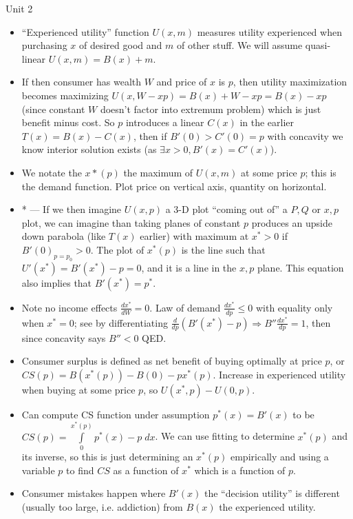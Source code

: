 \documentclass[10pt,twocolumn]{article}
\newcommand{\rd}[2]{\frac{d#1}{d#2}}
\begin{document}
Unit 2
\begin{itemize}
    \item ``Experienced utility'' function $U(x, m)$ measures utility experienced when purchasing $x$ of desired good and $m$ of other stuff. We will assume quasi-linear $U(x,m) = B(x) + m$.
    \item If then consumer has wealth $W$ and price of $x$ is $p$, then utility maximization becomes maximizing $U(x, W - xp) = B(x) + W - xp = B(x) - xp$ (since constant $W$ doesn't factor into extremum problem) which is just benefit minus cost. So $p$ introduces a linear $C(x)$ in the earlier $T(x) = B(x) - C(x)$, then if $B'(0) > C'(0) = p$ with concavity we know interior solution exists (as $\exists x > 0, B'(x) = C'(x)$). 
    \item We notate the $x*(p)$ the maximum of $U(x,m)$ at some price $p$; this is the demand function. Plot price on vertical axis, quantity on horizontal. 
    \item * --- If we then imagine $U(x,p)$ a 3-D plot ``coming out of'' a $P,Q$ or $x,p$ plot, we can imagine than taking planes of constant $p$ produces an upside down parabola (like $T(x)$ earlier) with maximum at $x^* > 0$ if $B'(0)_{p=p_0} > 0$. The plot of $x^*(p)$ is the line such that $U'(x^*) = B'(x^*) - p = 0$, and it is a line in the $x,p$ plane. This equation also implies that $B'(x^*) = p^*$. 
    \item Note no income effects $\rd{x^*}{W} = 0$. Law of demand $\rd{x^*}{p} \leq 0$ with equality only when $x^* = 0$; see by differentiating $\rd{}{p}(B'(x^*) - p) \Rightarrow B'' \rd{x^*}{p} = 1$, then since concavity says $B'' < 0$ QED.
    \item Consumer surplus is defined as net benefit of buying optimally at price $p$, or $CS(p) = B(x^*(p))- B(0) - px^*(p)$. Increase in experienced utility when buying at some price $p$, so $U(x^*,p) - U(0,p)$. 
    \item Can compute CS function under assumption $p^*(x) = B'(x)$ to be $CS(p) = \displaystyle\int\limits_{0}^{x^*(p)}p^*(x) - p\;dx$. We can use fitting to determine $x^*(p)$ and its inverse, so this is just determining an $x^*(p)$ empirically and using a variable $p$ to find $CS$ as a function of $x^*$ which is a function of $p$.
    \item Consumer mistakes happen where $B'(x)$ the ``decision utility'' is different (usually too large, i.e. addiction) from $B(x)$ the experienced utility.
\end{itemize}
\end{document}
